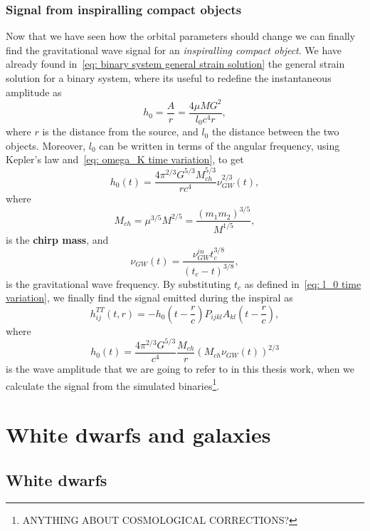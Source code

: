 \subsubsection{Signal from inspiralling compact objects}
Now that we have seen how the orbital parameters should change we can finally find the gravitational wave signal for an \textit{inspiralling compact object}.
We have already found in~\eqref{eq: binary system general strain solution} the general strain solution for a binary system, where its useful to redefine the instantaneous amplitude as
\[
    h_0 = \frac{A}{r} = \frac{4\mu M G^2}{l_0c^4r},
\]
where $r$ is the distance from the source, and $l_0$ the distance between the two objects.
Moreover, $l_0$ can be written in terms of the angular frequency, using Kepler's law and~\eqref{eq: omega_K time variation}, to get
\[
    h_0(t)=\frac{4\pi^{2/3}G^{5/3}M_{ch}^{5/3}}{rc^4}\nu_{GW}^{2/3}(t),
\]
where
\begin{equation}
    M_{ch} = \mu^{3/5}M^{2/5} = \frac{(m_1m_2)^{3/5}}{M^{1/5}},
    \label{eq: chirp mass definition}
\end{equation}
is the \textbf{chirp mass}, and 
\begin{equation}
    \nu_{GW}(t)=\frac{\nu_{GW}^{in}t_c^{3/8}}{(t_c-t)^{3/8}},
    \label{eq: nu time variation}
\end{equation}
is the gravitational wave frequency.
By substituting $t_c$ as defined in~\eqref{eq: l_0 time variation}, we finally find the signal emitted during the inspiral as
\begin{equation}
    h_{ij}^{TT}(t,r)= -h_0\left(t-\frac{r}{c}\right)P_{ijkl}A_{kl}\left(t-\frac{r}{c}\right),
    \label{eq: full inspiral signal}
\end{equation}
where
\begin{equation}
    \boxed{h_0(t)= \frac{4\pi^{2/3}G^{5/3}}{c^4}\frac{M_{ch}}{r}(M_{ch}\nu_{GW}(t))^{2/3}}
    \label{eq: the strain we use}
\end{equation}
is the wave amplitude that we are going to refer to in this thesis work, when we calculate the signal from the simulated binaries\footnote{ANYTHING ABOUT COSMOLOGICAL CORRECTIONS?}.





\section{White dwarfs and galaxies}
\subsection{White dwarfs}
